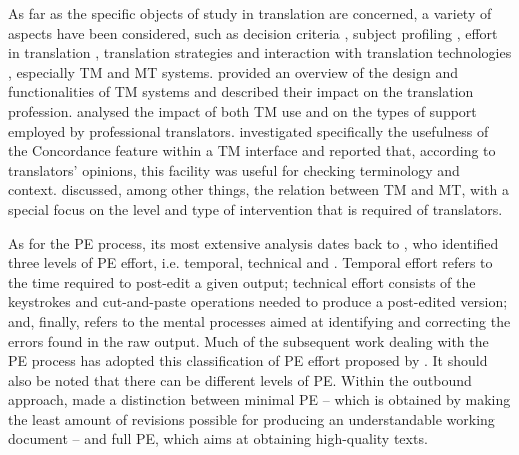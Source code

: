 \documentclass[output=paper]{LSP/langsci}
\begin{document}
As far as the specific objects of study in translation  are concerned, a variety of aspects have been considered, such as decision criteria \citep{TirkkonenCondit1989}, subject profiling \citep{Munoz2010}, effort in translation \citep{Alves2012}, translation strategies \citep{Gerloff1986, Krings1986Translation} and interaction with translation technologies \citep{OBrien2010b}, especially TM and MT systems.  provided an overview of the design and functionalities of TM systems and described their impact on the translation profession.  analysed the impact of both TM use and  on the types of support employed by professional translators.  investigated specifically the usefulness of the Concordance feature within a TM interface and reported that, according to translators' opinions, this facility was useful for checking terminology and context.  discussed, among other things, the relation between TM and MT, with a special focus on the level and type of intervention that is required of translators.

As for the PE process, its most extensive analysis dates back to \citet{Krings2001}, who identified three levels of PE effort, i.e. temporal, technical and . Temporal effort refers to the time required to post-edit a given output; technical effort consists of the keystrokes and cut-and-paste operations needed to produce a post-edited version; and, finally,  refers to the mental processes aimed at identifying and correcting the errors found in the raw output. Much of the subsequent work dealing with the PE process has adopted this classification of PE effort proposed by \citet{Krings2001}. It should also be noted that there can be different levels of PE. Within the outbound approach, \citet{Allen2003} made a distinction between minimal PE -- which is obtained by making the least amount of revisions possible for producing an understandable working document -- and full PE, which aims at obtaining high-quality texts.
\end{document}

